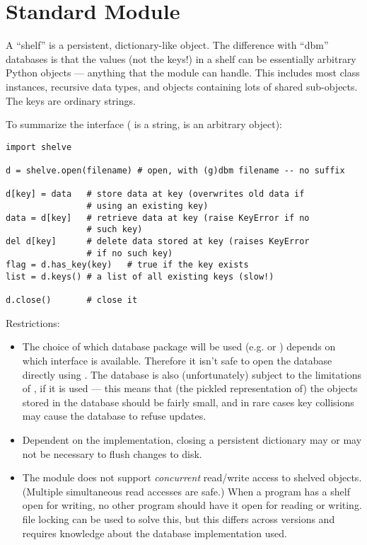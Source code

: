 \section{Standard Module }
\label{module-shelve}

A ``shelf'' is a persistent, dictionary-like object.  The difference
with ``dbm'' databases is that the values (not the keys!) in a shelf
can be essentially arbitrary Python objects --- anything that the
 module can handle.  This includes most class instances,
recursive data types, and objects containing lots of shared
sub-objects.  The keys are ordinary strings.

To summarize the interface ( is a string,  is an
arbitrary object):

\begin{verbatim}
import shelve

d = shelve.open(filename) # open, with (g)dbm filename -- no suffix

d[key] = data   # store data at key (overwrites old data if
                # using an existing key)
data = d[key]   # retrieve data at key (raise KeyError if no
                # such key)
del d[key]      # delete data stored at key (raises KeyError
                # if no such key)
flag = d.has_key(key)   # true if the key exists
list = d.keys() # a list of all existing keys (slow!)

d.close()       # close it
\end{verbatim}
%
Restrictions:

\begin{itemize}

\item
The choice of which database package will be used (e.g.  or
)
depends on which interface is available.  Therefore it isn't safe to
open the database directly using .  The database is also
(unfortunately) subject to the limitations of , if it is used ---
this means that (the pickled representation of) the objects stored in
the database should be fairly small, and in rare cases key collisions
may cause the database to refuse updates.

\item
Dependent on the implementation, closing a persistent dictionary may
or may not be necessary to flush changes to disk.

\item
The  module does not support \emph{concurrent} read/write
access to shelved objects.  (Multiple simultaneous read accesses are
safe.)  When a program has a shelf open for writing, no other program
should have it open for reading or writing.  \UNIX{} file locking can
be used to solve this, but this differs across \UNIX{} versions and
requires knowledge about the database implementation used.

\end{itemize}
